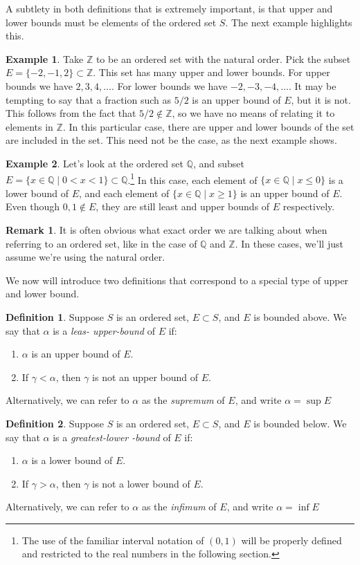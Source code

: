 \documentclass{article}
\newcommand{\Q}{\mathbb{Q}}
\newcommand{\Z}{\mathbb{Z}}
\theoremstyle{definition}
\newtheorem{definition}{Definition}[section]
\newtheorem{example}{Example}[section]
\newtheorem{remark}{Remark}[section]
\begin{document}
A subtlety in both definitions that is extremely important, is that upper and lower bounds must be elements of the ordered set $ S $. The next example highlights this. 
\begin{example}
 Take $ \Z $ to be an ordered set with the natural order. Pick the subset $ E=\{-2,-1,2\}\subset \Z $. This set has many upper and lower bounds. For upper bounds we have $ 2,3,4,\ldots $. For lower bounds we have $ -2,-3,-4,\ldots
  $. It may be tempting to say that a fraction such as $ 5/2 $ is an upper bound of $ E $, but it is not. This follows from the fact that $ 5/2\notin \Z $, so we have no means of relating it to elements in $ \Z $. In this particular case, there are upper and lower bounds of the set are included in the set. This need not be the case, as the next example shows.  
\end{example}
\begin{example}
	Let's look at the ordered set $ \Q $, and subset $ E=\{x\in\Q\mid 0<x<1\}\subset \Q $.\footnote{The use of the familiar interval notation of $ (0,1) $ will be properly defined and restricted to the real numbers in the following section.} In this case, each element of $ \{x\in\Q\mid x\le 0\} $ is a lower bound of $ E $, and  each element of $ \{x\in\Q\mid x\ge 1\} $ is an upper bound of $ E $. Even though $ 0,1\notin E $, they are still least and upper bounds of $ E $ respectively. 
\end{example}
\begin{remark}
	It is often obvious what exact order we are talking about when referring to an ordered set, like in the case of $ \Q $ and $ \Z $. In these cases, we'll just assume we're using the natural order.  
\end{remark}
We now will introduce two definitions that correspond to a special type of upper and lower bound.
\begin{definition}
	Suppose $ S $ is an ordered set, $ E\subset S $, and $ E $ is bounded above. We say that $ \alpha $ is a \textit{\color{red}leas- upper-bound} of $ E $ if:
	\begin{enumerate}
		\item $ \alpha $ is an upper bound of $ E $.
		\item If $ \gamma<\alpha $, then $ \gamma $ is not an upper bound of $ E $.
	\end{enumerate}
Alternatively, we can refer to $ \alpha $ as the \textit{\color{red}supremum} of $ E $, and write $ \alpha=\sup E $
\end{definition}
\begin{definition}
	Suppose $ S $ is an ordered set, $ E\subset S $, and $ E $ is bounded below. We say that $ \alpha $ is a \textit{\color{red}greatest-lower -bound} of $ E $ if:
	\begin{enumerate}
		\item $ \alpha $ is a lower bound of $ E $.
		\item If $ \gamma>\alpha $, then $ \gamma $ is not a lower bound of $ E $.
	\end{enumerate}
	Alternatively, we can refer to $ \alpha $ as the \textit{\color{red}infimum} of $ E $, and write $ \alpha=\inf E $
\end{definition}
\end{document}
